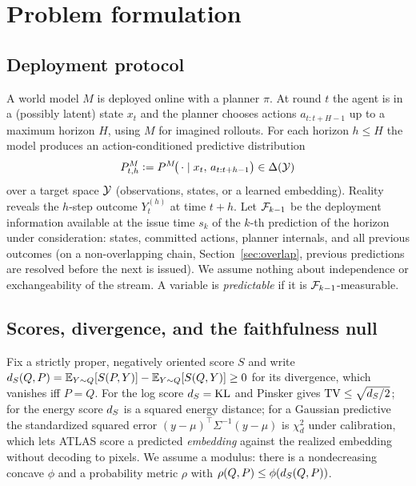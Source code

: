 \section{Problem formulation}\label{sec:setup}

\subsection{Deployment protocol}

A world model $M$ is deployed online with a planner $\pi$. At round $t$ the agent is in a (possibly
latent) state $x_t$ and the planner chooses actions $a_{t:t+H-1}$ up to a maximum horizon $H$, using
$M$ for imagined rollouts. For each horizon $h\le H$ the model produces an action-conditioned
predictive distribution
\begin{equation}
P^M_{t,h}\vcentcolon= P^M\!\big(\,\cdot\mid x_t,\,a_{t:t+h-1}\big)\in\Delta(\mathcal{Y})
\end{equation}
over a target space $\mathcal{Y}$ (observations, states, or a learned embedding). Reality reveals the
$h$-step outcome $Y^{(h)}_t$ at time $t{+}h$. Let $\mathcal{F}_{k-1}$ be the deployment information available at the issue time $s_k$ of the $k$-th prediction of the horizon under consideration: states, committed actions, planner internals, and all previous outcomes (on a non-overlapping chain, Section~\ref{sec:overlap}, previous predictions are resolved before the next is issued). We assume nothing about independence or
exchangeability of the stream. A variable is \emph{predictable} if it is $\mathcal{F}_{k-1}$-measurable.

\subsection{Scores, divergence, and the faithfulness null}

Fix a strictly proper, negatively oriented score $S$ \citep{gneiting2007strictly} and write
$d_S(Q,P)=\mathbb{E}_{Y\sim Q}[S(P,Y)]-\mathbb{E}_{Y\sim Q}[S(Q,Y)]\ge0$ for its divergence, which vanishes iff
$P=Q$. For the log score $d_S=\mathrm{KL}$ and Pinsker gives $\mathrm{TV}\le\sqrt{d_S/2}$; for the energy
score $d_S$ is a squared energy distance; for a Gaussian predictive the standardized squared error
$(y-\mu)^\top\Sigma^{-1}(y-\mu)$ is $\chi^2_d$ under calibration, which lets ATLAS score a predicted
\emph{embedding} against the realized embedding without decoding to pixels. We assume a modulus: there is a
nondecreasing concave $\phi$ and a probability metric $\rho$ with $\rho(Q,P)\le\phi(d_S(Q,P))$.

